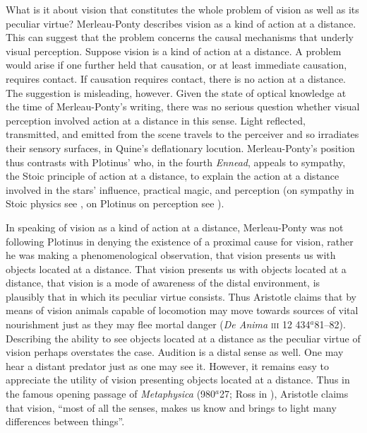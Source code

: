 \documentclass[12pt]{article}
\begin{document}
What is it about vision that constitutes the whole problem of vision as well as its peculiar virtue? Merleau-Ponty describes vision as a kind of action at a distance. This can suggest that the problem concerns the causal mechanisms that underly visual perception. Suppose vision is a kind of action at a distance. A problem would arise if one further held that causation, or at least immediate causation, requires contact. If causation requires contact, there is no action at a distance. The suggestion is misleading, however. Given the state of optical knowledge at the time of Merleau-Ponty's writing, there was no serious question whether visual perception involved action at a distance in this sense.  Light reflected, transmitted, and emitted from the scene travels to the perceiver and so irradiates their sensory surfaces, in Quine's \citeyearpar{Quine:1960rm} deflationary locution. Merleau-Ponty's position thus contrasts with Plotinus' who, in the fourth \emph{Ennead}, appeals to sympathy, the Stoic principle of action at a distance, to explain the action at a distance involved in the stars' influence, practical magic, and perception (on sympathy in Stoic physics see \citealt{Sambursky:1959ms}, on Plotinus on perception see \citealt{Emilsson:1988uq}).

In speaking of vision as a kind of action at a distance, Merleau-Ponty was not following Plotinus in denying the existence of a proximal cause for vision, rather he was making a phenomenological observation, that vision presents us with objects located at a distance. That vision presents us with objects located at a distance, that vision is a mode of awareness of the distal environment, is plausibly that in which its peculiar virtue consists. Thus Aristotle claims that by means of vision animals capable of locomotion may move towards sources of vital nourishment just as they may flee mortal danger (\emph{De Anima} \textsc{iii} 12 434\( ^{a} \)81--82). Describing the ability to see objects located at a distance as the peculiar virtue of vision perhaps overstates the case. Audition is a distal sense as well. One may hear a distant predator just as one may see it. However, it remains easy to appreciate the utility of vision presenting objects located at a distance. Thus in the famous opening passage of \emph{Metaphysica} (980\( ^{a} \)27; Ross in \citealt{Barnes:1984kx}), Aristotle claims that vision, ``most of all the senses, makes us know and brings to light many differences between things''.
\end{document}
